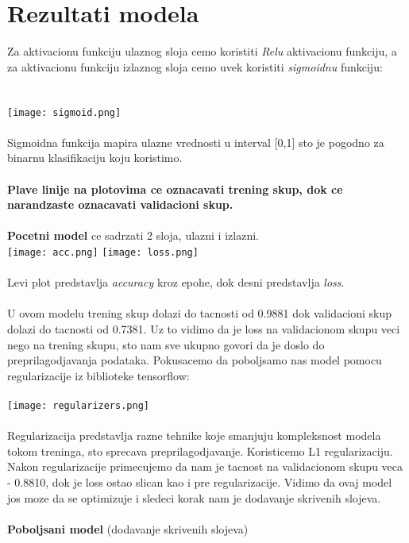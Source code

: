 \documentclass{article}
\begin{document}
\section{Rezultati modela}
Za aktivacionu funkciju ulaznog sloja cemo koristiti \textit{Relu} aktivacionu funkciju, a za aktivacionu funkciju izlaznog sloja cemo uvek koristiti \textit{sigmoidnu} funkciju: \\
\\
\\
 \texttt{[image: sigmoid.png]}\\
\\
Sigmoidna funkcija mapira ulazne vrednosti u interval [0,1] sto je pogodno za binarnu klasifikaciju koju koristimo.\\
\\
\textbf{Plave linije na plotovima ce oznacavati trening skup, dok ce narandzaste oznacavati validacioni skup.}\\
\\
\textbf{Pocetni model} ce sadrzati 2 sloja, ulazni i izlazni. \\
\texttt{[image: acc.png]}
\texttt{[image: loss.png]}\\
\\
Levi plot predstavlja \textit{accuracy} kroz epohe, dok desni predstavlja \textit{loss}.\\
\\
U ovom modelu trening skup dolazi do tacnosti od 0.9881 dok validacioni skup dolazi do tacnosti od 0.7381.
Uz to vidimo da je loss na validacionom skupu veci nego na trening skupu, sto nam sve ukupno govori da je doslo do preprilagodjavanja podataka. Pokusacemo da poboljsamo nas model pomocu regularizacije iz biblioteke tensorflow:\\
\\
\texttt{[image: regularizers.png]}\\
\\
Regularizacija predstavlja razne tehnike koje smanjuju kompleksnost modela tokom treninga, sto sprecava preprilagodjavanje. Koristicemo L1 regularizaciju.\\
Nakon regularizacije primecujemo da nam je tacnost na validacionom skupu veca - 0.8810, dok je loss ostao slican kao i pre regularizacije. Vidimo da ovaj model jos moze da se optimizuje i sledeci korak nam je dodavanje skrivenih slojeva.\\
\\
\textbf{Poboljsani model} (dodavanje skrivenih slojeva)\\ 
\end{document}
